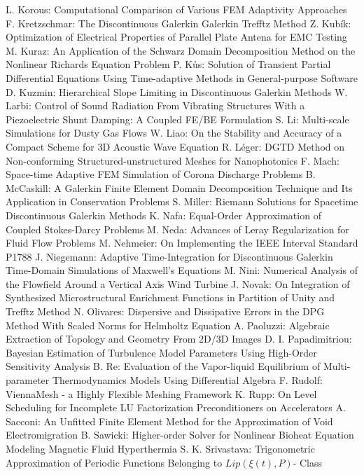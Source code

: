 \documentclass[10pt, A4]{article}%
\begin{document}
{L. Korous}: {Computational Comparison of Various FEM Adaptivity Approaches}
{F. Kretzschmar}: {The Discontinuous Galerkin Galerkin Trefftz Method}
{Z. Kubík}: {Optimization of Electrical Properties of Parallel Plate Antena for EMC Testing}
{M. Kuraz}: {An Application of the Schwarz Domain Decomposition Method on the Nonlinear Richards Equation Problem}
{P. Kůs}: {Solution of Transient Partial Differential Equations Using Time-adaptive Methods in General-purpose Software}
{D. Kuzmin}: {Hierarchical Slope Limiting in  Discontinuous Galerkin Methods}
{W. Larbi}: {Control of Sound Radiation From Vibrating Structures With a Piezoelectric Shunt Damping: A Coupled FE/BE Formulation}
{S. Li}: {Multi-scale Simulations for Dusty Gas Flows}
{W. Liao}: {On the Stability and Accuracy of a Compact Scheme for 3D Acoustic Wave Equation}
{R. Léger}: {DGTD  Method  on  Non-conforming  Structured-unstructured  Meshes  for Nanophotonics}
{F. Mach}: {Space-time Adaptive FEM Simulation of Corona Discharge Problems}
{B. McCaskill}: {A Galerkin Finite Element Domain Decomposition Technique and Its Application in Conservation Problems}
{S. Miller}: {Riemann Solutions for Spacetime Discontinuous Galerkin Methods}
{K. Nafa}: {Equal-Order Approximation of Coupled Stokes-Darcy Problems}
{M. Neda}: {Advances of Leray Regularization for Fluid Flow Problems}
{M. Nehmeier}: {On Implementing  the IEEE Interval Standard P1788}
{J. Niegemann}: {Adaptive Time-Integration for Discontinuous Galerkin Time-Domain Simulations of Maxwell's Equations}
{M. Nini}: {Numerical Analysis of the Flowfield Around a Vertical Axis Wind Turbine}
{J. Novak}: {On Integration of Synthesized Microstructural Enrichment Functions in Partition of Unity and Trefftz Method}
{N. Olivares}: {Dispersive and Dissipative Errors in the DPG Method With Scaled Norms for Helmholtz Equation}
{A. Paoluzzi}: {Algebraic Extraction of Topology and Geometry From 2D/3D Images}
{D. I. Papadimitriou}: {Bayesian Estimation of Turbulence Model Parameters Using High-Order Sensitivity Analysis}
{B. Re}: {Evaluation of the Vapor-liquid Equilibrium of Multi-parameter Thermodynamics Models Using Differential Algebra}
{F. Rudolf}: {ViennaMesh - a Highly Flexible Meshing Framework}
{K. Rupp}: {On Level Scheduling for Incomplete LU Factorization Preconditioners on Accelerators}
{A. Sacconi}: {An Unfitted Finite Element Method for the Approximation of Void Electromigration}
{B. Sawicki}: {Higher-order Solver for Nonlinear Bioheat Equation Modeling Magnetic Fluid Hyperthermia}
{S. K. Srivastava}: {Trigonometric Approximation of Periodic Functions Belonging to $Lip(\xi(t), P)$- Class}
\end{document}
